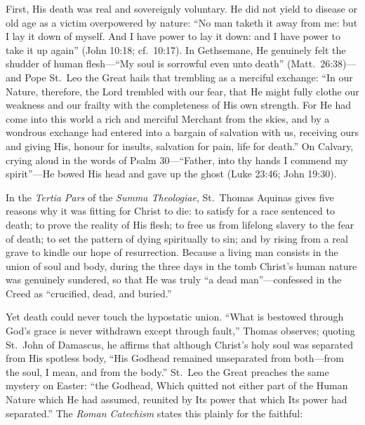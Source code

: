 First, His death was real and sovereignly voluntary. He did not yield to disease or old age as a victim overpowered by nature: ``No man taketh it away from me: but I lay it down of myself. And I have power to lay it down: and I have power to take it up again'' (John 10:18; cf.\ 10:17). In Gethsemane, He genuinely felt the shudder of human flesh---``My soul is sorrowful even unto death'' (Matt.\ 26:38)---and Pope St.~Leo the Great hails that trembling as a merciful exchange: ``In our Nature, therefore, the Lord trembled with our fear, that He might fully clothe our weakness and our frailty with the completeness of His own strength. For He had come into this world a rich and merciful Merchant from the skies, and by a wondrous exchange had entered into a bargain of salvation with us, receiving ours and giving His, honour for insults, salvation for pain, life for death.'' On Calvary, crying aloud in the words of Psalm 30---``Father, into thy hands I commend my spirit''---He bowed His head and gave up the ghost (Luke 23:46; John 19:30).

In the \emph{Tertia Pars} of the \emph{Summa Theologiae}, St.~Thomas Aquinas gives five reasons why it was fitting for Christ to die: to satisfy for a race sentenced to death; to prove the reality of His flesh; to free us from lifelong slavery to the fear of death; to set the pattern of dying spiritually to sin; and by rising from a real grave to kindle our hope of resurrection. Because a living man consists in the union of soul and body, during the three days in the tomb Christ's human nature was genuinely sundered, so that He was truly ``a dead man''---confessed in the Creed as ``crucified, dead, and buried.''

Yet death could never touch the hypostatic union. ``What is bestowed through God's grace is never withdrawn except through fault,'' Thomas observes; quoting St.~John of Damascus, he affirms that although Christ's holy soul was separated from His spotless body, ``His Godhead remained unseparated from both---from the soul, I mean, and from the body.'' St.~Leo the Great preaches the same mystery on Easter: ``the Godhead, Which quitted not either part of the Human Nature which He had assumed, reunited by Its power that which Its power had separated.'' The \emph{Roman Catechism} states this plainly for the faithful:

